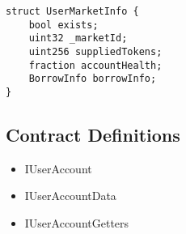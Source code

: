 \begin{lstlisting}[firstnumber=10]
struct UserMarketInfo {
    bool exists;
    uint32 _marketId;
    uint256 suppliedTokens;
    fraction accountHealth;
    BorrowInfo borrowInfo;
}
\end{lstlisting}

\subsection{Contract Definitions}

\begin{itemize}
\item IUserAccount
\item IUserAccountData
\item IUserAccountGetters
\end{itemize}
